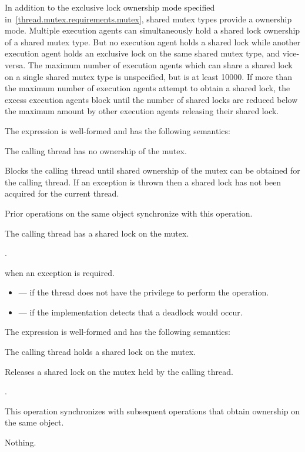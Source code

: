 \pnum
{}%
In addition to the exclusive lock ownership mode specified
in~\ref{thread.mutex.requirements.mutex}, shared mutex types provide a
 ownership mode. Multiple execution agents can
simultaneously hold a shared lock ownership of a shared mutex type. But no
execution agent holds a shared lock while another execution agent holds an
exclusive lock on the same shared mutex type, and vice-versa. The maximum
number of execution agents which can share a shared lock on a single shared
mutex type is unspecified, but is at least 10000. If more than the
maximum number of execution agents attempt to obtain a shared lock, the
excess execution agents block until the number of shared locks are
reduced below the maximum amount by other execution agents releasing their
shared lock.

\pnum
The expression  is well-formed and has the
following semantics:

\begin{itemdescr}
\pnum
\expects
The calling thread has no ownership of the mutex.

\pnum
{}%
\effects
Blocks the calling thread until shared ownership of the mutex can be obtained for the calling thread.
If an exception is thrown then a shared lock has not been acquired for the current thread.

\pnum
\sync
Prior  operations on the same object synchronize with this operation.

\pnum
\ensures
The calling thread has a shared lock on the mutex.

\pnum
\returntype {}.

\pnum
\throws
{} when an exception is required.

\pnum
\errors
\begin{itemize}
\item {} --- if the thread does not have the privilege to perform the operation.
\item {} --- if the implementation detects that a deadlock would occur.
\end{itemize}
\end{itemdescr}

\pnum
The expression  is well-formed and has the following semantics:

\begin{itemdescr}
\pnum
\expects
The calling thread holds a shared lock on the mutex.

\pnum
\effects
Releases a shared lock on the mutex held by the calling thread.

\pnum
\returntype {}.

\pnum
\sync
This operation synchronizes with subsequent
 operations that obtain ownership on the same object.

\pnum
\throws
Nothing.
\end{itemdescr}

